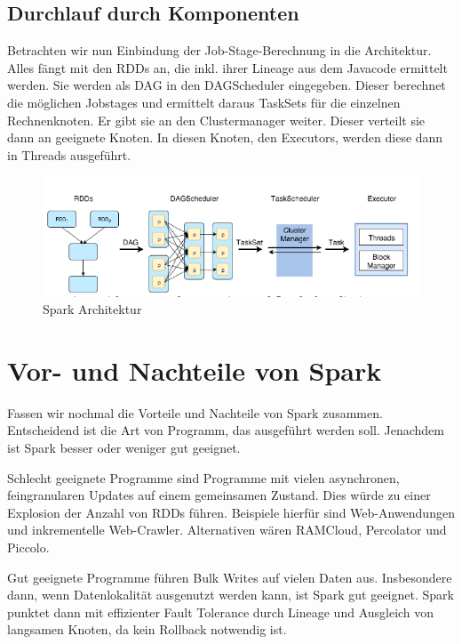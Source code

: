 \bigskip

\subsection[Durchlauf durch
Komponenten]{\rmfamily Durchlauf durch
Komponenten}
Betrachten wir nun Einbindung der Job-Stage-Berechnung in die
Architektur. Alles fängt mit den RDDs an, die inkl. ihrer Lineage aus
dem Javacode ermittelt werden. Sie werden als DAG in den DAGScheduler
eingegeben. Dieser berechnet die möglichen Jobstages und ermittelt
daraus TaskSets für die einzelnen Rechnenknoten. Er gibt sie an den
Clustermanager weiter. Dieser verteilt sie dann an geeignete Knoten. In
diesen Knoten, den Executors, werden diese dann in Threads ausgeführt. 

\begin{figure}
\centering
\includegraphics[width=\textwidth]{bilder/Seminartext-img3.png}
\caption{Spark Architektur \cite{SparkInternals}}
\end{figure}

\bigskip

\section[Vor{}- und Nachteile von
Spark]{\rmfamily Vor- und Nachteile von Spark}
Fassen wir nochmal die Vorteile und Nachteile von Spark zusammen.
Entscheidend ist die Art von Programm, das ausgeführt werden soll.
Jenachdem ist Spark besser oder weniger gut geeignet.

Schlecht geeignete Programme sind Programme mit vielen asynchronen,
feingranularen Updates auf einem gemeinsamen Zustand. Dies würde zu
einer Explosion der Anzahl von RDDs führen. Beispiele hierfür sind
Web-Anwendungen und inkrementelle Web-Crawler. Alternativen wären
RAMCloud, Percolator und Piccolo.

Gut geeignete Programme führen Bulk Writes auf vielen Daten aus.
Insbesondere dann, wenn Datenlokalität ausgenutzt werden kann, ist
Spark gut geeignet. Spark punktet dann mit effizienter Fault Tolerance
durch Lineage und Ausgleich von langsamen Knoten, da kein Rollback
notwendig ist.

